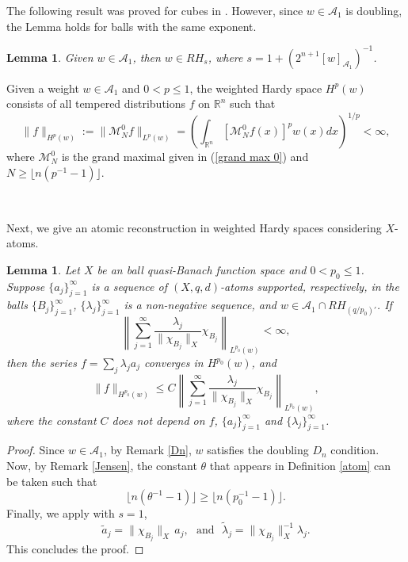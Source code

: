 \documentclass[oneside,10pt]{article}
\newtheorem{lemma}[theorem]{Lemma}
\begin{document}
The following result was proved for cubes in \cite{Lerner}. However, since $w \in \mathcal{A}_1$ is doubling, the Lemma holds for balls with the same exponent.

\begin{lemma} \label{A1 y RHs}
Given $w \in \mathcal{A}_1$, then $w \in RH_s$, where $s= 1 + (2^{n+1} [w]_{\mathcal{A}_1})^{-1}$.
\end{lemma}

Given a weight $w \in \mathcal{A}_{1}$ and $0 < p \leq 1$, the weighted Hardy space $H^{p}(w)$ consists of all tempered distributions $f$ on 
$\mathbb{R}^n$ such that
\[
\| f \|_{H^{p}(w)} := \| \mathcal{M}^{0}_{N}f \|_{L^{p}(w)} = \left( \int_{\mathbb{R}^{n}}  
[\mathcal{M}^{0}_{N} f(x)]^{p} w(x) dx \right)^{1/p} < \infty,
\]
where $\mathcal{M}^{0}_{N}$ is the grand maximal given in (\ref{grand max 0}) and $N \geq \lfloor n (p^{-1}-1) \rfloor$.

\

Next, we give an atomic reconstruction in weighted Hardy spaces considering $X$-atoms.

\begin{lemma} \label{X atom Hw}
Let $X$ be an ball quasi-Banach function space and $0 < p_0 \leq 1$. Suppose $\{ a_j \}_{j=1}^{\infty}$ is a sequence of 
$(X, q, d)$-atoms supported, respectively, in the balls $\{ B_j \}_{j=1}^{\infty}$, $\{ \lambda_j \}_{j=1}^{\infty}$ is a non-negative sequence, and $w \in \mathcal{A}_1 \cap RH_{(q/p_0)'}$. If
\[
\left\|  \sum_{j=1}^{\infty} \frac{\lambda_j}{\| \chi_{B_j} \|_{X}} \chi_{B_j} \right\|_{L^{p_0}(w)} < \infty,
\]
then the series $f = \sum_j \lambda_j a_j$ converges in $H^{p_0}(w)$, and
\[
\| f \|_{H^{p_0}(w)} \leq C \left\|  \sum_{j=1}^{\infty} \frac{\lambda_j}{\| \chi_{B_j} \|_{X}} \chi_{B_j} \right\|_{L^{p_0}(w)},
\]
where the constant $C$ does not depend on $f$, $\{ a_j \}_{j=1}^{\infty}$ and $\{ \lambda_j \}_{j=1}^{\infty}$.
\end{lemma}

\begin{proof}
Since $w \in \mathcal{A}_1$, by Remark \ref{Dn}, $w$ satisfies the doubling $D_n$ condition. Now, by Remark \ref{Jensen}, the constant 
$\theta$ that appears in Definition \ref{atom} can be taken such that 
\[
\lfloor n (\theta^{-1} - 1) \rfloor \geq \lfloor n (p_0^{-1} - 1) \rfloor.
\]
Finally, we apply \cite[Theorem 1, on p. 111-112]{tor} with $s=1$, 
\[
\widetilde{a}_j = \| \chi_{B_j} \|_{X} \, a_j, \,\,\,\, \text{and} \,\,\,\, \widetilde{\lambda}_j = \| \chi_{B_j} \|_{X}^{-1} \lambda_j.
\]
This concludes the proof.
\end{proof}
\end{document}
